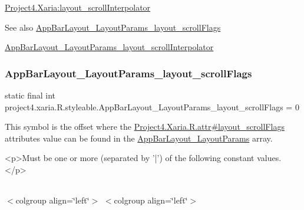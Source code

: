 {\ttfamily \hyperlink{classproject4_1_1xaria_1_1R_1_1styleable_a73bbf7a84cde8c331a2578189008a585}{Project4.\+Xaria\+:layout\+\_\+scroll\+Interpolator}}

\begin{DoxySeeAlso}{See also}
\hyperlink{classproject4_1_1xaria_1_1R_1_1styleable_a765b6973ff46793cb361150ce22c3f86}{App\+Bar\+Layout\+\_\+\+Layout\+Params\+\_\+layout\+\_\+scroll\+Flags} 

\hyperlink{classproject4_1_1xaria_1_1R_1_1styleable_a73bbf7a84cde8c331a2578189008a585}{App\+Bar\+Layout\+\_\+\+Layout\+Params\+\_\+layout\+\_\+scroll\+Interpolator} 
\end{DoxySeeAlso}
\mbox{\label{classproject4_1_1xaria_1_1R_1_1styleable_a765b6973ff46793cb361150ce22c3f86}} 
\subsubsection{\texorpdfstring{App\+Bar\+Layout\+\_\+\+Layout\+Params\+\_\+layout\+\_\+scroll\+Flags}{AppBarLayout\_LayoutParams\_layout\_scrollFlags}}
{\footnotesize\ttfamily static final int project4.\+xaria.\+R.\+styleable.\+App\+Bar\+Layout\+\_\+\+Layout\+Params\+\_\+layout\+\_\+scroll\+Flags = 0\hspace{0.3cm}{\ttfamily [static]}}

This symbol is the offset where the \hyperlink{}{Project4.\+Xaria.\+R.\+attr\#layout\+\_\+scroll\+Flags} attribute\textquotesingle{}s value can be found in the \hyperlink{classproject4_1_1xaria_1_1R_1_1styleable_ad61d02ae9d1a09e70900bcff9afa224d}{App\+Bar\+Layout\+\_\+\+Layout\+Params} array.

\begin{DoxyVerb}      <p>Must be one or more (separated by '|') of the following constant values.</p>
\end{DoxyVerb}
 \tabulinesep=1mm
\begin{longtabu} spread 0pt [c]{*{0}{|X[-1]}|}
\hline
\end{longtabu}
$<$colgroup align=\char`\"{}left\char`\"{}$>$ $<$colgroup align=\char`\"{}left\char`\"{}$>$ 

